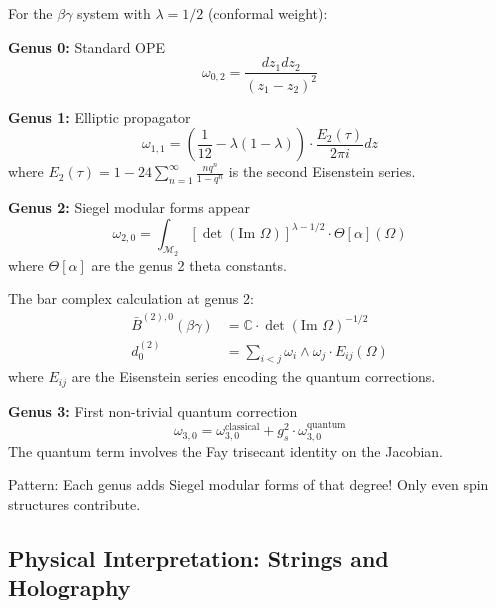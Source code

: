\begin{example}
For the $\beta\gamma$ system with $\lambda = 1/2$ (conformal weight):

\textbf{Genus 0:} Standard OPE
$$\omega_{0,2} = \frac{dz_1 dz_2}{(z_1 - z_2)^2}$$

\textbf{Genus 1:} Elliptic propagator
$$\omega_{1,1} = \left(\frac{1}{12} - \lambda(1-\lambda)\right) \cdot \frac{E_2(\tau)}{2\pi i} dz$$
where $E_2(\tau) = 1 - 24\sum_{n=1}^\infty \frac{nq^n}{1-q^n}$ is the second Eisenstein series.

\textbf{Genus 2:} Siegel modular forms appear
$$\omega_{2,0} = \int_{\mathcal{M}_2} \left[\det(\text{Im }\Omega)\right]^{\lambda - 1/2} \cdot \Theta[\alpha](\Omega)$$
where $\Theta[\alpha]$ are the genus 2 theta constants.

The bar complex calculation at genus 2:
\begin{align}
\bar{B}^{(2),0}(\beta\gamma) &= \mathbb{C} \cdot \det(\text{Im }\Omega)^{-1/2} \\
d^{(2)}_0 &= \sum_{i<j} \omega_i \wedge \omega_j \cdot E_{ij}(\Omega)
\end{align}
where $E_{ij}$ are the Eisenstein series encoding the quantum corrections.

\textbf{Genus 3:} First non-trivial quantum correction
$$\omega_{3,0} = \omega_{3,0}^{\text{classical}} + g_s^2 \cdot \omega_{3,0}^{\text{quantum}}$$
The quantum term involves the Fay trisecant identity on the Jacobian.

Pattern: Each genus adds Siegel modular forms of that degree! Only even spin structures contribute.
\end{example}


\subsection{Physical Interpretation: Strings and Holography}\label{subsec:physics}

